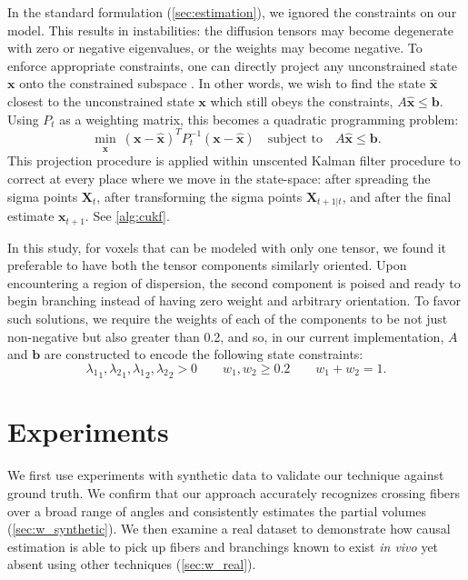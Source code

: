 \documentclass[final,hyperref]{gatech-thesis}
\renewcommand{\v}[1]{\ensuremath{\mathbf #1}\xspace}
\newcommand{\lx}{{\ensuremath{\lambda_1}} \xspace}
\newcommand{\ly}{{\ensuremath{\lambda_2}} \xspace}
\newcommand{\x}{\v x}
\newcommand{\X}{\v X}
\begin{document}
In the standard formulation (\autoref{sec:estimation}), we ignored the
constraints on our model.  This results in instabilities:  the diffusion
tensors may become degenerate with zero or negative eigenvalues, or the
weights may become negative.  To enforce appropriate constraints, one can
directly project any unconstrained state $\x$ onto the constrained subspace
\cite{Simon2006}.  In other words, we wish to find the state $\hat{\x}$
closest to the unconstrained state $\x$ which still obeys the constraints,
$A\hat{\x} \le \v{b}$.  Using $P_t$ as a weighting matrix, this becomes a
quadratic programming problem:
\begin{equation} \label{eq:constrained}
  \min_{\hat{\x}} \ (\x - \hat{\x})^T P_t^{-1} (\x - \hat{\x})
  \quad
  \text{subject to}
  \quad
  A\hat{\x} \le \v{b} .
\end{equation}
This projection procedure is applied within unscented Kalman filter procedure
to correct at every place where we move in the state-space: after spreading
the sigma points $\X_t$, after transforming the sigma points $\X_{t+1|t}$, and
after the final estimate $\x_{t+1}$.  See \autoref{alg:cukf}.


In this study, for voxels that can be modeled with only one tensor, we found
it preferable to have both the tensor components similarly oriented.  Upon
encountering a region of dispersion, the second component is poised and ready
to begin branching instead of having zero weight and arbitrary orientation.
To favor such solutions, we require the weights of each of the components to
be not just non-negative but also greater than 0.2, and so, in our current
implementation, $A$ and \v{b} are constructed to encode the following state
constraints:
\begin{equation} \label{eq:constraints}
  \lx_1, \ly_1, \lx_2, \ly_2 > 0
  \qquad
  w_1, w_2 \ge 0.2
  \qquad
  w_1 + w_2 = 1 .
\end{equation}



\section{Experiments}

We first use experiments with synthetic data to validate our technique against
ground truth.  We confirm that our approach accurately recognizes crossing
fibers over a broad range of angles and consistently estimates the partial
volumes (\autoref{sec:w_synthetic}).  We then examine a real dataset to
demonstrate how causal estimation is able to pick up fibers and branchings
known to exist \textit{in vivo} yet absent using other techniques
(\autoref{sec:w_real}).
\end{document}
